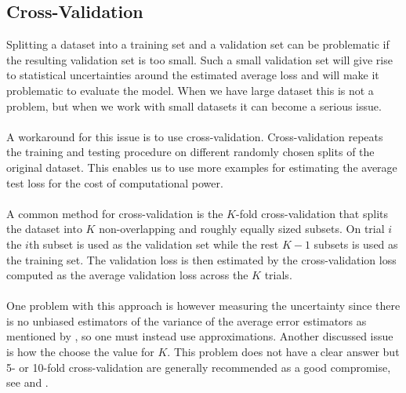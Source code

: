 \subsection{Cross-Validation} \label{sec:cv}
Splitting a dataset into a training set and a validation set can be problematic if the resulting validation set is too small. Such a small validation set will give rise to statistical uncertainties around the estimated average loss and will make it problematic to evaluate the model. When we have large dataset this is not a problem, but when we work with small datasets it can become a serious issue. \\
\\
A workaround for this issue is to use cross-validation. Cross-validation repeats the training and testing procedure on different randomly chosen splits of the original dataset. This enables us to use more examples for estimating the average test loss for the cost of computational power. \\
\\
A common method for cross-validation is the $K$-fold cross-validation that splits the dataset into $K$ non-overlapping and roughly equally sized subsets. On trial $i$ the $i$th subset is used as the validation set while the rest $K - 1$ subsets is used as the training set. The validation loss is then estimated by the cross-validation loss computed as the average validation loss across the $K$ trials.\\
\\
One problem with this approach is however measuring the uncertainty since there is no unbiased estimators of the variance of the average error estimators as mentioned by \cite{Bengio04}, so one must instead use approximations. Another discussed issue is how the choose the value for $K$. This problem does not have a clear answer but 5- or 10-fold cross-validation are generally recommended as a good compromise, see \cite{brieman_spector_1992} and \cite{kohavi_1992}.

